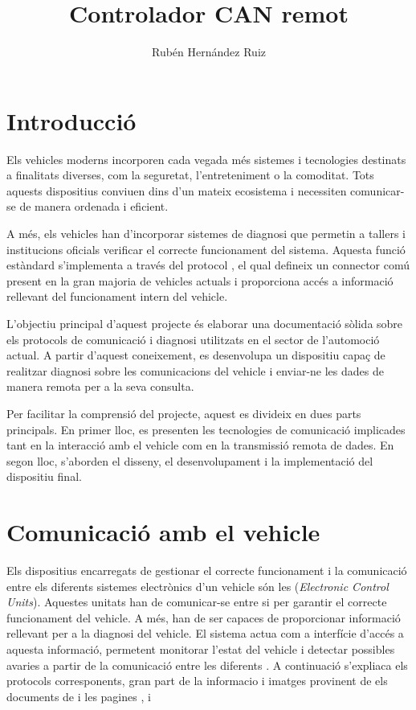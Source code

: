 \documentclass{tfgitic}[2024/07/01]
\title{
  Controlador CAN remot
}
\author{Rubén Hernández Ruiz}
\begin{document}
\chapter{Introducció}

Els vehicles moderns incorporen cada vegada més sistemes i tecnologies destinats a finalitats diverses, com la seguretat, l'entreteniment o la comoditat. Tots aquests dispositius 
conviuen dins d'un mateix ecosistema i necessiten comunicar-se de manera ordenada i eficient. 

A més, els vehicles han d'incorporar sistemes de diagnosi que permetin a tallers i institucions oficials verificar el correcte funcionament del sistema. Aquesta funció estàndard 
s'implementa a través del protocol , el qual defineix un connector comú present en la gran majoria de vehicles actuals i proporciona accés a informació rellevant del funcionament 
intern del vehicle.

L'objectiu principal d'aquest projecte és elaborar una documentació sòlida sobre els protocols de comunicació i diagnosi utilitzats en el sector de l'automoció actual. A partir 
d'aquest coneixement, es desenvolupa un dispositiu capaç de realitzar diagnosi sobre les comunicacions del vehicle i enviar-ne les dades de manera remota per a la seva consulta.

Per facilitar la comprensió del projecte, aquest es divideix en dues parts principals. En primer lloc, es presenten les tecnologies de comunicació implicades tant en la interacció 
amb el vehicle com en la transmissió remota de dades. En segon lloc, s'aborden el disseny, el desenvolupament i la implementació del dispositiu final.

\chapter{Comunicació amb el vehicle}

Els dispositius encarregats de gestionar el correcte funcionament i la comunicació entre els diferents sistemes electrònics d’un vehicle són les  (\textit{Electronic Control Units}). 
Aquestes unitats han de comunicar-se entre si per garantir el correcte funcionament del vehicle. A més, han de ser capaces de proporcionar informació rellevant per a la diagnosi del vehicle. 
El sistema  actua com a interfície d'accés a aquesta informació, permetent monitorar l'estat del vehicle i detectar possibles avaries a partir de la comunicació entre les diferents 
. A continuació s'expliaca els protocols corresponents, gran part de la informacio i imatges provinent de els documents de \cite{csselectronics_can} i les pagines \cite{wikipedia_can}, 
\cite{wikipedia_obd2} i \cite{embien_obd2}
\end{document}
